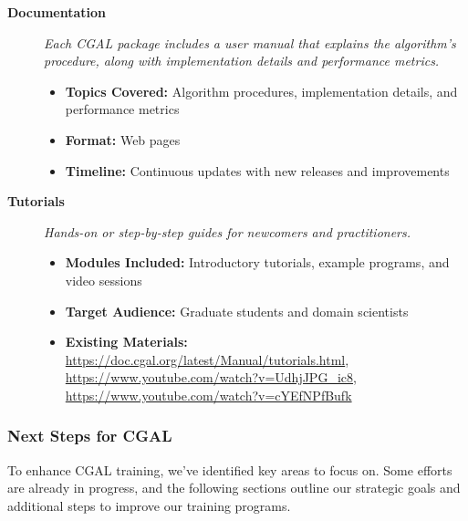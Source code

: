 \begin{description}
\item[\textbf{Documentation}]
\emph{Each CGAL package includes a user manual that explains the algorithm's procedure, along with implementation details and performance metrics.}

\begin{itemize}
  \item \textbf{Topics Covered:} Algorithm procedures, implementation details, and performance metrics
  \item \textbf{Format:} Web pages
  \item \textbf{Timeline:} Continuous updates with new releases and improvements
\end{itemize}

\item[\textbf{Tutorials}]
\emph{Hands-on or step-by-step guides for newcomers and practitioners.}

\begin{itemize}
  \item \textbf{Modules Included:} Introductory tutorials, example programs, and video sessions
  \item \textbf{Target Audience:} Graduate students and domain scientists
  \item \textbf{Existing Materials:} \url{https://doc.cgal.org/latest/Manual/tutorials.html}, \url{https://www.youtube.com/watch?v=UdhjJPG_ic8}, \url{https://www.youtube.com/watch?v=cYEfNPfBufk}
\end{itemize}

\end{description}

\subsubsection{Next Steps for CGAL}
\label{sec:CGAL:next-steps}

To enhance CGAL training, we've identified key areas to focus on. Some efforts are already in progress, and the following sections outline our strategic goals and additional steps to improve our training programs.

